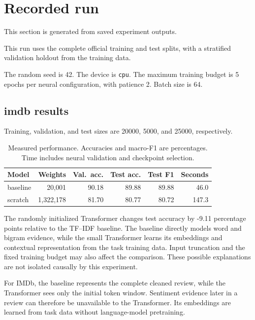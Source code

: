 \section{Recorded run}

This section is generated from saved experiment outputs.

This run uses the complete official training and test splits, with a stratified validation holdout from the training data.

The random seed is 42. The device is \texttt{cpu}. The maximum training budget is 5 epochs per neural configuration, with patience 2. Batch size is 64.

\subsection{imdb results}

Training, validation, and test sizes are 20000, 5000, and 25000, respectively.

\begin{table}[htbp]\centering\small

\caption{Measured performance. Accuracies and macro-F1 are percentages. Time includes neural validation and checkpoint selection.}

\begin{tabular}{lrrrrr}\toprule

Model & Weights & Val.\ acc. & Test acc. & Test F1 & Seconds\\\midrule

baseline & 20,001 & 90.18 & 89.88 & 89.88 & 46.0\\

scratch & 1,322,178 & 81.70 & 80.77 & 80.72 & 147.3\\

\bottomrule\end{tabular}\end{table}

The randomly initialized Transformer changes test accuracy by -9.11 percentage points relative to the TF--IDF baseline. The baseline directly models word and bigram evidence, while the small Transformer learns its embeddings and contextual representation from the task training data. Input truncation and the fixed training budget may also affect the comparison. These possible explanations are not isolated causally by this experiment.

For IMDb, the baseline represents the complete cleaned review, while the Transformer sees only the initial token window. Sentiment evidence later in a review can therefore be unavailable to the Transformer. Its embeddings are learned from task data without language-model pretraining.

